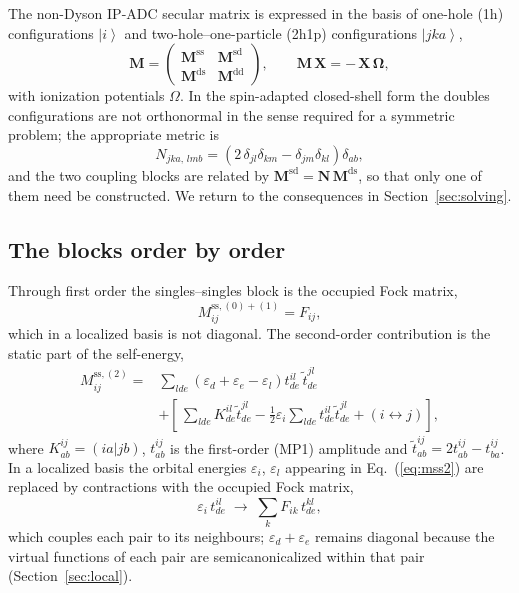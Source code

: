 \documentclass[aip,jcp,amsmath,amssymb,preprint,superscriptaddress]{revtex4-2}%
\newcommand{\ket}[1]{\left|#1\right\rangle}
\newcommand{\Mss}{\mathbf{M}^{\text{ss}}}
\newcommand{\Msd}{\mathbf{M}^{\text{sd}}}
\newcommand{\Mds}{\mathbf{M}^{\text{ds}}}
\newcommand{\Mdd}{\mathbf{M}^{\text{dd}}}
\begin{document}
The non-Dyson IP-ADC secular matrix is expressed in the basis of one-hole
(1h) configurations $\ket{i}$ and two-hole--one-particle (2h1p)
configurations $\ket{jka}$,
%
\begin{equation}
  \mathbf{M} =
  \begin{pmatrix} \Mss & \Msd \\[2pt] \Mds & \Mdd \end{pmatrix},
  \qquad
  \mathbf{M}\,\mathbf{X} = -\,\mathbf{X}\,\bm{\Omega},
  \label{eq:secular}
\end{equation}
%
with ionization potentials $\Omega$. In the spin-adapted closed-shell form
the doubles configurations are not orthonormal in the sense required for a
symmetric problem; the appropriate metric is
%
\begin{equation}
  N_{jka,\,lmb} =
    \left(2\,\delta_{jl}\delta_{km} - \delta_{jm}\delta_{kl}\right)\delta_{ab},
  \label{eq:metric}
\end{equation}
%
and the two coupling blocks are related by $\Msd = \mathbf{N}\,\Mds$, so that
only one of them need be constructed. We return to the consequences in
Section~\ref{sec:solving}.

\subsection{The blocks order by order}

Through first order the singles--singles block is the occupied Fock matrix,
%
\begin{equation}
  M^{\text{ss},(0)+(1)}_{ij} = F_{ij},
\end{equation}
%
which in a localized basis is not diagonal. The second-order contribution is
the static part of the self-energy,
%
\begin{align}
  M^{\text{ss},(2)}_{ij} =
    &\sum_{lde}\left(\varepsilon_d + \varepsilon_e - \varepsilon_l\right)
       t^{il}_{de}\,\tilde{t}^{jl}_{de} \nonumber\\
    &+ \left[\,\sum_{lde} K^{il}_{de}\tilde{t}^{jl}_{de}
       - \tfrac12 \varepsilon_i \sum_{lde} t^{il}_{de}\tilde{t}^{jl}_{de}
       + (i \leftrightarrow j)\right],
  \label{eq:mss2}
\end{align}
%
where $K^{ij}_{ab}=(ia|jb)$, $t^{ij}_{ab}$ is the first-order (MP1) amplitude
and $\tilde{t}^{ij}_{ab} = 2t^{ij}_{ab}-t^{ij}_{ba}$. In a localized basis the
orbital energies $\varepsilon_i$, $\varepsilon_l$ appearing in
Eq.~(\ref{eq:mss2}) are replaced by contractions with the occupied Fock
matrix,
%
\begin{equation}
  \varepsilon_i\, t^{il}_{de} \;\longrightarrow\; \sum_k F_{ik}\, t^{kl}_{de},
  \label{eq:eps_sub}
\end{equation}
%
which couples each pair to its neighbours; $\varepsilon_d+\varepsilon_e$
remains diagonal because the virtual functions of each pair are
semicanonicalized within that pair (Section~\ref{sec:local}).
\end{document}
